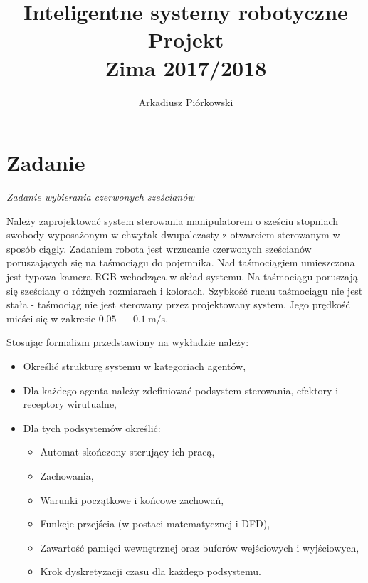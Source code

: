 \documentclass{article}
\title{Inteligentne systemy robotyczne\\Projekt\\Zima 2017/2018}
\author{Arkadiusz Piórkowski}
\begin{document}
\maketitle


\section*{Zadanie}

\begin{center}
\textit{Zadanie wybierania czerwonych sze\'scianów}
\end{center}

Należy zaprojektować system sterowania manipulatorem o sze\'sciu stopniach swobody wyposażonym w chwytak dwupalczasty z otwarciem sterowanym w sposób ciągly. Zadaniem robota jest wrzucanie czerwonych sze\'scianów poruszających się na ta\'smociągu do pojemnika. Nad ta\'smociągiem umieszczona jest typowa kamera RGB wchodząca w skład systemu. Na ta\'smociągu poruszają się sze\'sciany o różnych rozmiarach i kolorach. Szybko\'sć ruchu ta\'smociągu nie jest stała - ta\'smociąg nie jest sterowany przez projektowany system. Jego prędko\'sć mie\'sci się w zakresie $0.05~-~0.1~\mbox{m/s}$.

Stosując formalizm przedstawiony na wykładzie należy:
\begin{itemize}
\item Okre\'slić strukturę systemu w kategoriach agentów,
\item Dla każdego agenta należy zdefiniować podsystem sterowania, efektory i receptory wirutualne,
\item Dla tych podsystemów okre\'slić:
\begin{itemize}
\item Automat skończony sterujący ich pracą,
\item Zachowania,
\item Warunki początkowe i końcowe zachowań,
\item Funkcje przej\'scia (w postaci matematycznej i DFD),
\item Zawarto\'sć pamięci wewnętrznej oraz buforów wej\'sciowych i wyj\'sciowych,
\item Krok dyskretyzacji czasu dla każdego podsystemu.
\end{itemize}
\end{itemize}

\newpage
\end{document}
